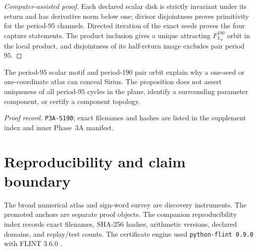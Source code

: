 \documentclass[11pt]{article}
\theoremstyle{definition}
\theoremstyle{remark}
\begin{document}
\begin{proof}[Computer-assisted proof]
Each declared scalar disk is strictly invariant under its return and has derivative norm below one; divisor disjointness proves primitivity for the period-$95$ channels.  Directed iteration of the exact seeds proves the four capture statements.  The product inclusion gives a unique attracting $F_{L_S}^{190}$ orbit in the local product, and disjointness of its half-return image excludes pair period $95$.
\end{proof}

The period-$95$ scalar motif and period-$190$ pair orbit explain why a one-seed or one-coordinate atlas can conceal Sirius.  The proposition does not assert uniqueness of all period-$95$ cycles in the plane, identify a surrounding parameter component, or certify a component topology.

\noindent\emph{Proof record.} \texttt{P3A-S190}; exact filenames and hashes are listed in the supplement index and inner Phase~3A manifest.

\section{Reproducibility and claim boundary}

The broad numerical atlas and sign-word survey are discovery instruments.  The promoted anchors are separate proof objects.  The companion reproducibility index records exact filenames, SHA-256 hashes, arithmetic versions, declared domains, and replay/test counts.  The certificate engine used \texttt{python-flint 0.9.0} with FLINT $3.6.0$ \citep{FLINT2026}.
\end{document}
